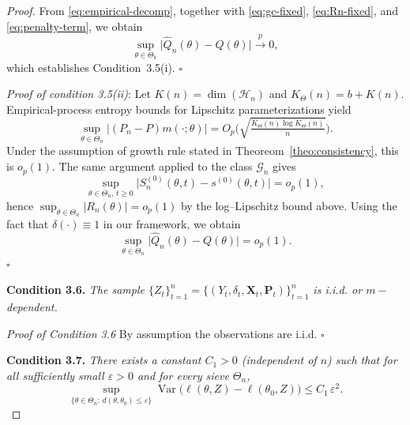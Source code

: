 \documentclass[11pt]{article}
\DeclareMathOperator{\Var}{Var}
\newenvironment{condition}[1]
  {\par\medskip\noindent\textbf{Condition #1.}\itshape}
  {\medskip}
\begin{document}
\begin{proof}
        From \eqref{eq:empirical-decomp}, together with
        \eqref{eq:gc-fixed}, \eqref{eq:Rn-fixed}, and \eqref{eq:penalty-term}, we obtain
        \[
        \sup_{\theta\in\Theta_k}\bigl|\hat Q_n(\theta)-Q(\theta)\bigr|
        \xrightarrow{p}0,
        \]
        which establishes Condition~3.5(i). \hfill $\square$

		\noindent \textit{Proof of condition 3.5(ii)}:
		Let $K(n)=\dim(\mathcal H_{n})$ and $K_\Theta(n)=b+K(n)$.
		Empirical-process entropy bounds for Lipschitz parameterizations yield
		\[
		\sup_{\theta\in\Theta_{n}}\big|(P_n-P)m(\cdot;\theta)\big|
		=O_p\!\Big(\sqrt{\tfrac{K_\Theta(n)\log K_\Theta(n)}{n}}\Big).
		\]
		Under the assumption of growth rule stated in Theoreom~\ref{theo:consistency}, %
        this is $o_p(1)$.
		The same argument applied to the class $\mathcal G_{n}$ gives
		\[
		\sup_{\theta\in\Theta_{n},\,t\ge 0}
		\big|S_n^{(0)}(\theta,t)-s^{(0)}(\theta,t)\big|=o_p(1),
		\]
		hence $\sup_{\theta\in\Theta_{n}}|R_n(\theta)|=o_p(1)$ by the
		log–Lipschitz bound above. Using the fact that  $\delta(\cdot)\equiv1$ in our framework, we obtain
		\[
		\sup_{\theta\in\Theta_{n}}\big|\hat Q_n(\theta)-Q(\theta)\big|=o_p(1).
		\] \hfill $\square$
		
		
		\begin{condition}{3.6} The sample
		$\{Z_t\}_{t=1}^n=\{(Y_t,\delta_t,\bm X_t,\bm P_t)\}_{t=1}^n$ is i.i.d. or $m-$dependent.
        \end{condition}
		
		\noindent \textit{Proof of Condition 3.6} By assumption the observations are i.i.d. \hfill $\square$
		
		\begin{condition}{3.7} There exists a constant $C_1>0$ (independent of $n$) such that for all sufficiently small $\varepsilon>0$ and for every sieve $\Theta_n$,
		\[
		\sup_{\{\theta\in\Theta_n:\, d(\theta,\theta_0)\le\varepsilon\}}
		\Var\!\bigl(\ell(\theta,Z)-\ell(\theta_0,Z)\bigr)
		\le C_1\,\varepsilon^2 .
		\]
        \end{condition}
		

\end{proof}
\end{document}
